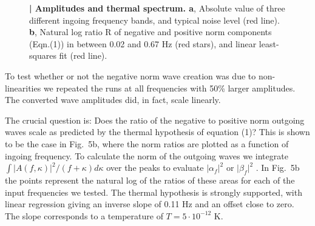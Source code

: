\documentclass[12pt,aps%
]{revtex4}
\begin{document}
\begin{figure}
\begin{center}

\caption{{\bf | Amplitudes and thermal spectrum. a}, Absolute value of
three different ingoing frequency bands, and typical noise level (red line).
{\bf b}, Natural log ratio R of negative and positive norm components
(Eqn.(1)) in between 0.02 and
0.67 Hz (red stars), and linear least-squares fit (red line).
}
\end{center}
\end{figure}

To test whether or not the negative norm wave creation was due to
non-linearities we repeated the runs at all frequencies with 50\% larger
amplitudes. The converted wave amplitudes did, in fact, scale linearly.  

The crucial question is: Does the ratio of the negative to positive norm
outgoing waves scale as predicted by the thermal hypothesis of equation (1)?
This is shown to be the case in Fig.\ 5b, where the norm ratios are plotted as
a function of ingoing frequency. To calculate the norm of the outgoing waves
we integrate $\int \vert A(f,\kappa)\vert^2/(f+\kappa) d\kappa$ over 
the peaks to evaluate $\vert \alpha_f\vert^2$ or $\vert \beta_f\vert^2$
. In Fig.\ 5b the points represent the natural  log of the ratios of these areas for
each of the input frequencies we tested. The thermal hypothesis is strongly
supported, with linear regression giving an inverse slope of 0.11 Hz and an
offset close to zero. The slope corresponds to a temperature of $T = 5 \cdot
10^{-12}$ K.
\end{document}
